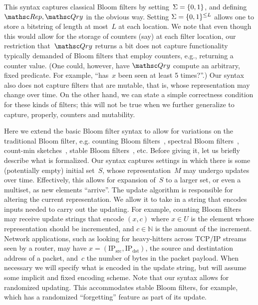 This syntax captures classical Bloom filters by setting~$\Sigma=\{0,1\}$,  and defining $\Rep,\Qry$ in the obvious way.  Setting $\Sigma=\{0,1\}^{\leq L}$ allows one to store a bitstring of length at most~$L$ at each location.   We note that even though this would allow for the storage of counters (say) at each filter location, our restriction that~$\Qry$ returns a bit does not capture functionality typically demanded of Bloom filters that employ counters, e.g., returning a counter value. (One could, however, have $\Qry$ compute an arbitrary, fixed predicate.  For example, ``has~$x$ been seen at least 5 times?''.)  
Our syntax also does not capture filters that are mutable, that is, whose representation may change over time. 
On the other hand, we can state a simple correctness condition for these kinds of filters; this will not be true when we further generalize to capture, properly, counters and mutability.



Here we extend the basic Bloom filter syntax to allow for variations on the traditional Bloom filter, e.g. counting Bloom filters~\cite{xxx}, spectral Bloom filters~\cite{xxx}, count-min sketches~\cite{xxx}, stable Bloom filters~\cite{xxx}, etc.   Before giving it, let us briefly describe what is formalized.  Our syntax captures settings in which there is some (potentially empty) initial set~$S$, whose representation~$M$ may undergo updates over time.  Effectively, this allows for expansion of~$S$ to a larger set, or even a multiset, as new elements ``arrive''.    The update algorithm is responsible for altering the current representation.  We allow it to take in a string that encodes inputs needed to carry out the updating.  For example, counting Bloom filters may receive update strings that encode $(x,c)$ where $x \in U$ is the element whose representation should be incremented, and $c \in \mathbb{N}$ is the amount of the increment.  Network applications, such as looking for heavy-hitters across TCP/IP streams seen by a router, may have $x = (\mathrm{IP_{src}},\mathrm{IP_{dst}})$, the source and destintation address of a packet, and~$c$ the number of bytes in the packet payload.  When necessary we will specify what is encoded in the update string, but will assume some implicit and fixed encoding scheme.  Note that our syntax allows for randomized updating.  This accommodates stable Bloom filters, for example, which has a randomized ``forgetting'' feature as part of its update.



